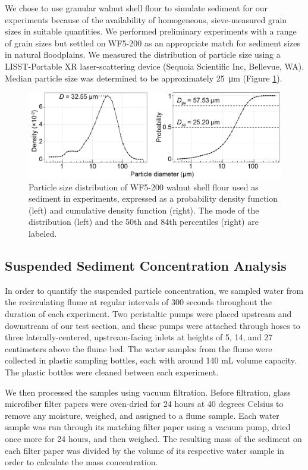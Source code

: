 \documentclass{scrreprt}
\begin{document}
We chose to use granular walnut shell flour to simulate sediment for our experiments because of the availability of homogeneous, sieve-measured grain sizes in suitable quantities. We performed preliminary experiments with a range of grain sizes but settled on WF5-200 as an appropriate match for sediment sizes in natural floodplains. We measured the distribution of particle size using a LISST-Portable XR laser-scattering device (Sequoia Scientific Inc, Bellevue, WA). Median particle size was determined to be approximately \SI{25}{\micro\metre} (Figure \ref{fig:sedsize}).

\begin{figure}[htbp]
\includegraphics[width=15cm] {wf5-200sizedist.png}
\centering
\caption{Particle size distribution of WF5-200 walnut shell flour used as sediment in experiments, expressed as a probability density function (left) and cumulative density function (right). The mode of the distribution (left) and the 50th and 84th percentiles (right) are labeled.} 
\label{fig:sedsize}
\end{figure}

\subsection{Suspended Sediment Concentration Analysis}

In order to quantify the suspended particle concentration, we sampled water from the recirculating flume at regular intervals of 300 seconds throughout the duration of each experiment. Two peristaltic pumps were placed upstream and downstream of our test section, and these pumps were attached through hoses to three laterally-centered, upstream-facing inlets at heights of 5, 14, and 27 centimeters above the flume bed. The water samples from the flume were collected in plastic sampling bottles, each with around 140 mL volume capacity. The plastic bottles were cleaned between each experiment. 

We then processed the samples using vacuum filtration. Before filtration, glass microfiber filter papers were oven-dried for 24 hours at 40 degrees Celsius to remove any moisture, weighed, and assigned to a flume sample. Each water sample was run through its matching filter paper using a vacuum pump, dried once more for 24 hours, and then weighed. The resulting mass of the sediment on each filter paper was divided by the volume of its respective water sample in order to calculate the mass concentration.
\end{document}
